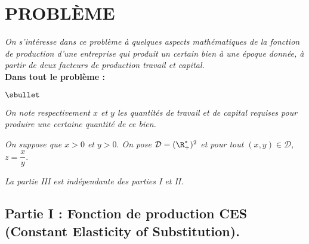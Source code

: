 \documentclass[11pt]{article}%
\begin{document}


\section*{PROBLÈME} %
\noindent 
{\it On s'intéresse dans ce problème à quelques aspects 
mathématiques de la fonction de production d'une entreprise
qui produit un certain bien à une époque donnée, à partir de deux 
facteurs de production travail et capital.}\\
\textbf{Dans tout le problème :}
\begin{noliste}{$\sbullet$}
 \item {\it On note respectivement $x$ et $y$ les quantités de 
 travail et de capital requises pour produire une certaine quantité de 
 ce bien.}
 \item {\it On suppose que $x>0$ et $y>0.$ On pose 
 $\mathcal{D}=(\R_+^*)^2$ et pour tout $(x,y)\in \mathcal{D},$ 
 $z=\dfrac{x}{y}.$}
\end{noliste}
{\it La partie III est indépendante des parties I et II.}


\subsection*{Partie I : Fonction de production CES (Constant Elasticity 
of Substitution).}
\end{document}
